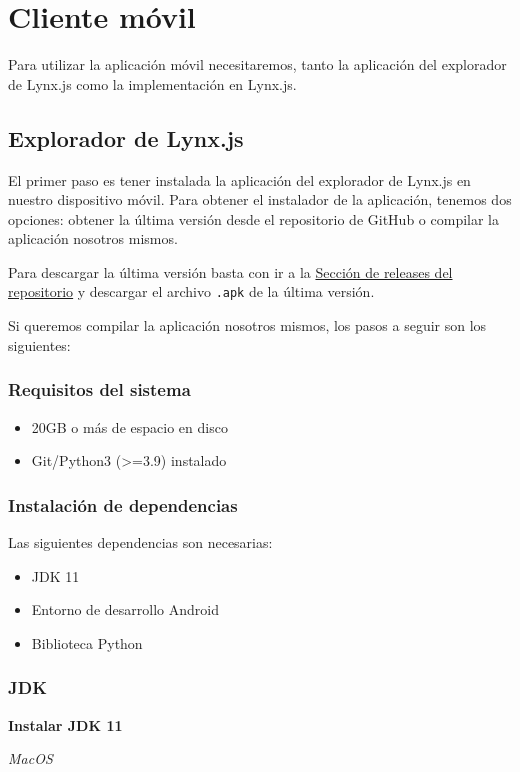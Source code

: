 \section{Cliente móvil}
Para utilizar la aplicación móvil necesitaremos, tanto la aplicación del explorador de Lynx.js como la implementación en Lynx.js.
\subsection{Explorador de Lynx.js}
El primer paso es tener instalada la aplicación del explorador de Lynx.js en nuestro dispositivo móvil.
Para obtener el instalador de la aplicación, tenemos dos opciones: obtener la última versión desde el repositorio de GitHub o compilar la aplicación nosotros mismos.

Para descargar la última versión basta con ir a la \href{https://github.com/alexrp-tfg/lynx-tfg/releases}{Sección de releases del repositorio} y descargar el archivo \texttt{.apk} de la última versión.

Si queremos compilar la aplicación nosotros mismos, los pasos a seguir son los siguientes:

\subsubsection{Requisitos del sistema}
\begin{itemize}
    \item 20GB o más de espacio en disco
    \item Git/Python3 (>=3.9) instalado
\end{itemize}

\subsubsection{Instalación de dependencias}
Las siguientes dependencias son necesarias:
\begin{itemize}
    \item JDK 11
    \item Entorno de desarrollo Android
    \item Biblioteca Python
\end{itemize}

\subsubsection{JDK}
\textbf{Instalar JDK 11}

\textit{MacOS}

